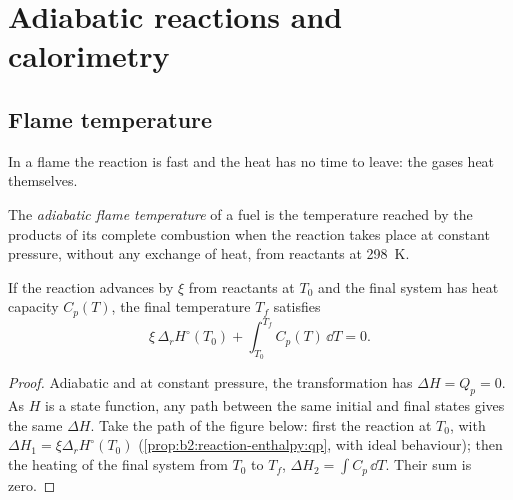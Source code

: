 \section{Adiabatic reactions and calorimetry}

\subsection*{Flame temperature}

In a flame the reaction is fast and the heat has no time to leave: the
gases heat themselves.

\begin{definition}\label{def:b2:reaction-enthalpy:flame-temperature}
The \emph{adiabatic flame temperature}
of a fuel is the temperature reached by the products of its complete
combustion when the reaction takes place at constant pressure, without
any exchange of heat, from reactants at \qty{298}{K}.
\end{definition}

\begin{proposition}\label{prop:b2:reaction-enthalpy:flame}
If the reaction advances by $\xi$ from reactants at $T_0$ and the final
system has heat capacity $C_p(T)$, the final temperature $T_f$ satisfies
\[
  \xi\,\Delta_r H^\circ(T_0) + \int_{T_0}^{T_f}C_p(T)\,\dd T = 0 .
\]
\end{proposition}

\begin{proof}
Adiabatic and at constant pressure, the transformation has $\Delta H =
Q_p = 0$. As $H$ is a state function, any path between the same initial and
final states gives the same $\Delta H$. Take the path of
the figure below: first the reaction at $T_0$, with
$\Delta H_1 = \xi\Delta_r H^\circ(T_0)$ (\cref{prop:b2:reaction-enthalpy:qp},
with ideal behaviour); then the heating of the final system from $T_0$ to
$T_f$, $\Delta H_2 = \int C_p\,\dd T$. Their sum is zero.
\end{proof}

